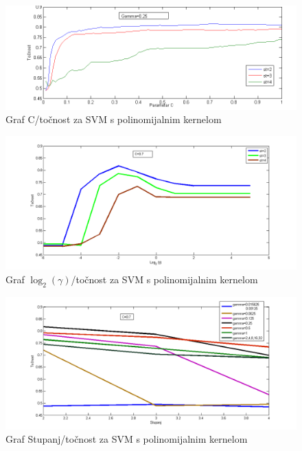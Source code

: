 \documentclass[conference]{IEEEtran}
\begin{document}
\begin{figure}[H]
\begin{minipage}{0.5\textwidth}
\centering
\includegraphics[width=\textwidth]{images/paramCPoly.png}
\caption{Graf C/točnost za SVM s polinomijalnim kernelom}
\end{minipage}
\end{figure}

\begin{figure}[H]
\begin{minipage}{0.5\textwidth}
\centering
\includegraphics[width=\textwidth]{images/paramGammaPoly.png}
\caption{Graf $\log _2(\gamma )$/točnost za SVM s polinomijalnim kernelom}
\end{minipage}
\end{figure}

\begin{figure}[H]
\begin{minipage}{0.5\textwidth}
\centering
\includegraphics[width=\textwidth]{images/paramDegreePoly.png}
\caption{Graf Stupanj/točnost za SVM s polinomijalnim kernelom}
\end{minipage}
\end{figure}
\end{document}
